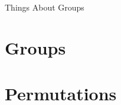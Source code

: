 \documentclass{memoir}
\begin{document}
\frontmatter
  \begin{center}
    \Large Things About Groups
  \end{center}

  \begin{KeepFromToc}
    \tableofcontents%
  \end{KeepFromToc}

\mainmatter
  \section{Groups}
    \label{sec:groups}
    
    \newpage

  \section{Permutations}
    \label{sec:perms}
    
    \newpage
\end{document}
